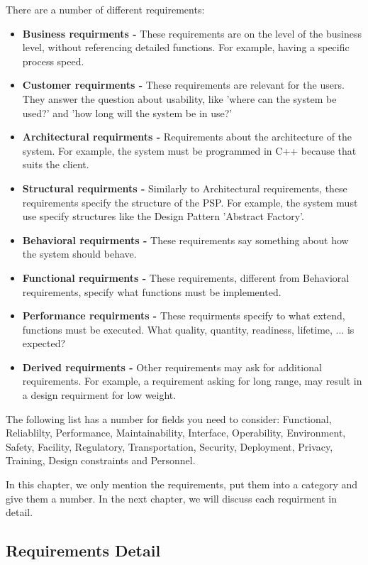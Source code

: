 \documentclass[10pt]{report}
\begin{document}
\noindent There are a number of different requirements:

\begin{itemize}
	\item \textbf{Business requirments -} These requirements are on the level of the business level, without referencing detailed functions. For example, having a specific process speed.
	\item \textbf{Customer requirments -} These requirements are relevant for the users. They answer the question about usability, like 'where can the system be used?' and 'how long will the system be in use?'
	\item \textbf{Architectural requirments -} Requirements about the architecture of the system. For example, the system must be programmed in C++ because that suits the client.
	\item \textbf{Structural requirments -} Similarly to Architectural requirements, these requirements specify the structure of the PSP. For example, the system must use specify structures like the Design Pattern 'Abstract Factory'.
	\item \textbf{Behavioral requirments -} These requirements say something about how the system should behave.
	\item \textbf{Functional requirments -} These requirements, different from Behavioral requirements, specify what functions must be implemented.
	\item \textbf{Performance requirments -} These requirments specify to what extend, functions must be executed. What quality, quantity, readiness, lifetime, ... is expected?
	\item \textbf{Derived requirments -} Other requirements may ask for additional requirements. For example, a requirement asking for long range, may result in a design requirment for low weight.
\end{itemize}

\noindent The following list has a number for fields you need to consider: Functional, Reliablilty, Performance, Maintainability, Interface, Operability, Environment, Safety, Facility, Regulatory, Transportation, Security, Deployment, Privacy, Training, Design constraints and Personnel.

In this chapter, we only mention the requirements, put them into a category and give them a number. In the next chapter, we will discuss each requirment in detail.

\subsection{Requirements Detail}
\end{document}
